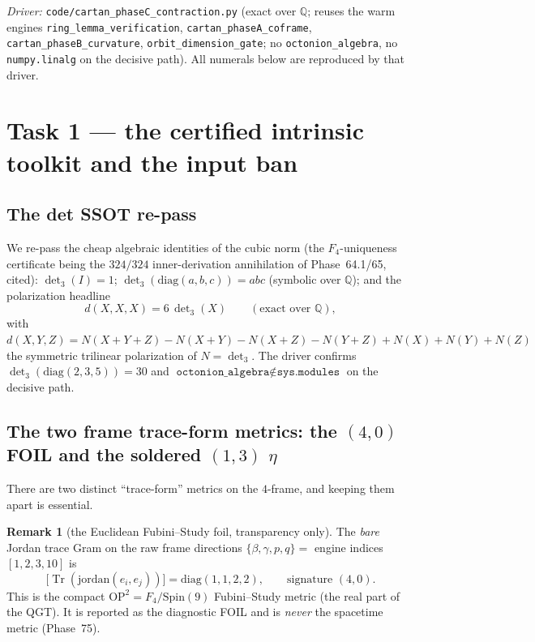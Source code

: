 \documentclass[11pt]{article}
\newcommand{\Q}{\mathbb{Q}}
\newcommand{\eu}{e}
\newcommand{\Tr}{\operatorname{Tr}}
\theoremstyle{definition}\newtheorem{remark}{Remark}
\theoremstyle{definition}\newtheorem{definition}{Definition}
\theoremstyle{plain}\newtheorem{proposition}{Proposition}
\theoremstyle{plain}\newtheorem{lemma}{Lemma}
\begin{document}
\medskip\noindent\emph{Driver:} \texttt{code/cartan\_phaseC\_contraction.py}
(exact over $\Q$; reuses the warm engines \texttt{ring\_lemma\_verification},
\texttt{cartan\_phaseA\_coframe}, \texttt{cartan\_phaseB\_curvature},
\texttt{orbit\_dimension\_gate}; no \texttt{octonion\_algebra}, no
\texttt{numpy.linalg} on the decisive path). All numerals below are reproduced by
that driver.

\section{Task 1 --- the certified intrinsic toolkit and the input ban}

\subsection{The det SSOT re-pass}
We re-pass the cheap algebraic identities of the cubic norm (the $F_4$-uniqueness
certificate being the $324/324$ inner-derivation annihilation of Phase~64.1/65,
cited): $\det\nolimits_3(I)=1$; $\det\nolimits_3(\mathrm{diag}(a,b,c))=abc$
(symbolic over $\Q$); and the polarization headline
\begin{equation}
  d(X,X,X)=6\,\det\nolimits_3(X)\qquad(\text{exact over }\Q),
\end{equation}
with $d(X,Y,Z)=N(X{+}Y{+}Z)-N(X{+}Y)-N(X{+}Z)-N(Y{+}Z)+N(X)+N(Y)+N(Z)$ the
symmetric trilinear polarization of $N=\det\nolimits_3$. The driver confirms
$\det\nolimits_3(\mathrm{diag}(2,3,5))=30$ and $\texttt{octonion\_algebra}\notin
\texttt{sys.modules}$ on the decisive path.

\subsection{The two frame trace-form metrics: the $(4,0)$ FOIL and the soldered $(1,3)$ $\eta$}
There are two distinct ``trace-form'' metrics on the $4$-frame, and keeping them apart
is essential.

\begin{remark}[the Euclidean Fubini--Study foil, transparency only]
The \emph{bare} Jordan trace Gram on the raw frame directions
$\{\beta,\gamma,p,q\}=$ engine indices $[1,2,3,10]$ is
\begin{equation}
  \bigl[\Tr(\mathrm{jordan}(\eu_i,\eu_j))\bigr]=\mathrm{diag}(1,1,2,2),
  \qquad\text{signature }(4,0).
\end{equation}
This is the compact $\mathrm{OP}^2=F_4/\mathrm{Spin}(9)$ Fubini--Study metric (the
real part of the QGT). It is reported as the diagnostic FOIL and is \emph{never} the
spacetime metric (Phase~75).
\end{remark}
\end{document}

